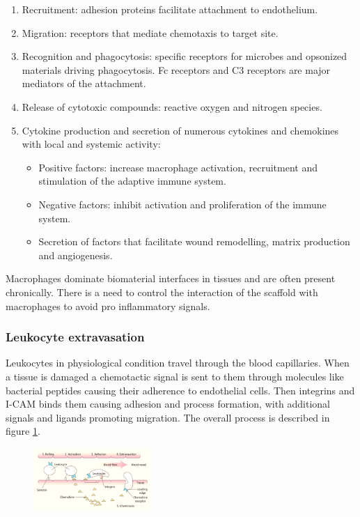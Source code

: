 		\begin{multicols}{2}
			\begin{enumerate}
				\item Recruitment: adhesion proteins facilitate attachment to endothelium.
				\item Migration: receptors that mediate chemotaxis to target site.
				\item Recognition and phagocytosis: specific receptors for microbes and opsonized materials driving phagocytosis.
					Fc receptors and C3 receptors are major mediators of the attachment.
				\item Release of cytotoxic compounds: reactive oxygen and nitrogen species.
				\item Cytokine production and secretion of numerous cytokines and chemokines with local and systemic activity:
					 \begin{itemize}
						\item Positive factors: increase macrophage activation, recruitment and  stimulation of the adaptive immune system.
						\item Negative factors: inhibit activation and proliferation of the immune system.
						\item Secretion of factors that facilitate wound remodelling, matrix production and angiogenesis.
					\end{itemize}
			\end{enumerate}
		\end{multicols}

			Macrophages dominate biomaterial interfaces in tissues and are often present chronically.
			There is a need to control the interaction of the scaffold with macrophages to avoid pro inflammatory signals.

		\subsubsection{Leukocyte extravasation}
		Leukocytes in physiological condition travel through the blood capillaries.
		When a tissue is damaged a chemotactic signal is sent to them through molecules like bacterial peptides causing their adherence to endothelial cells.
		Then integrins and I-CAM binds them causing adhesion and process formation, with additional signals and ligands promoting migration.
		The overall process is described in figure \ref{fig:leuko}.

		\begin{figure}[ht]
			\centering
			\includegraphics[width=0.4\textwidth]{leuko}
			\caption{\label{fig:leuko}}
		\end{figure}

